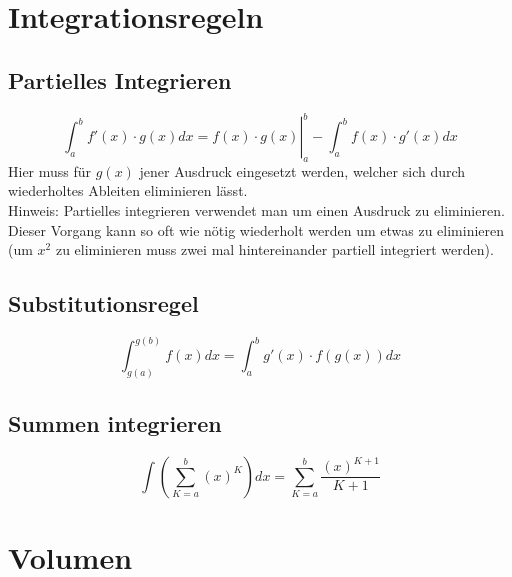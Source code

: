 



\section{Integrationsregeln}
\subsection{Partielles Integrieren}
\[ \boxed{\left. \int_a^b f'(x) \cdot g(x) dx = f(x) \cdot g(x) \right|_a^b - \int_a^b f(x) \cdot g'(x) dx} \]
Hier muss für $g(x)$ jener Ausdruck eingesetzt werden, welcher sich durch wiederholtes Ableiten eliminieren lässt.\\
Hinweis: Partielles integrieren verwendet man um einen Ausdruck zu eliminieren.
Dieser Vorgang kann so oft wie nötig wiederholt werden um etwas zu eliminieren (um $x^2$ zu eliminieren muss zwei mal hintereinander partiell integriert werden).
\subsection{Substitutionsregel}
\[ \boxed{\int_{g(a)}^{g(b)} f(x) dx = \int_{a}^{b} g'(x) \cdot f(g(x)) dx} \]

\subsection{Summen integrieren}
\[ \boxed{ \int \left( \sum_{K=a}^{b} (x)^K \right) dx= \sum_{K=a}^b \frac{(x)^{K+1}}{K+1} } \]

\section{Volumen}
